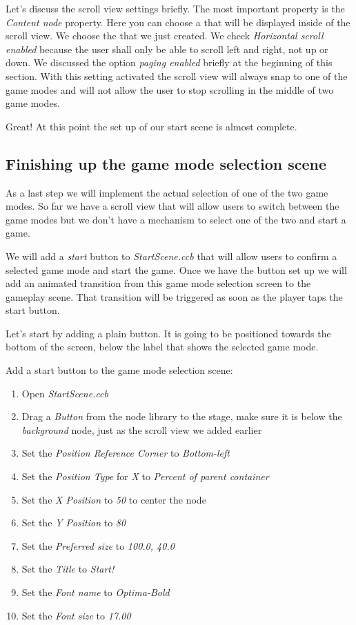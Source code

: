 Let's discuss the scroll view settings briefly. The most important property is
the \textit{Content node} property. Here you can choose a \ccbfile{} that will
be displayed inside of the scroll view. We choose the
 that we just created. We check
\textit{Horizontal scroll enabled} because the user shall only be able to scroll
left and right, not up or down. We discussed the option \textit{paging enabled}
briefly at the beginning of this section. With this setting activated the scroll
view will always snap to one of the game modes and will not allow the user to
stop scrolling in the middle of two game modes.

Great! At this point the set up of our start scene is almost complete.

\subsection{Finishing up the game mode selection scene}
As a last step we will implement the actual selection of one of the two game
modes. So far we have a scroll view that will allow users to switch between the
game modes but we don't have a mechanism to select one of the two and start a
game.

We will add a \textit{start} button to \textit{StartScene.ccb} that will
allow users to confirm a selected game mode and start the game. Once we have the button set up we will
add an animated transition from this game mode selection screen to the gameplay
scene. That transition will be triggered as soon as the player taps the start
button.

Let's start by adding a plain button. It is going to be positioned towards
the bottom of the screen, below the label that shows the selected game mode.

\begin{leftbar}
Add a start button to the game mode selection scene:
\begin{enumerate}
  \item Open \textit{StartScene.ccb} 
  \item Drag a \textit{Button} from the node library to
the stage, make sure it is below the \textit{background} node, just as the
scroll view we added earlier
  \item Set the \textit{Position Reference Corner} to \textit{Bottom-left}
  \item Set the \textit{Position Type} for \textit{X} to \textit{Percent of
  parent container}
  \item Set the \textit{X Position} to \textit{50} to center the node
  \item Set the \textit{Y Position} to \textit{80}
  \item Set the \textit{Preferred size} to \textit{100.0, 40.0}
  \item Set the \textit{Title} to \textit{Start!}
  \item Set the \textit{Font name} to \textit{Optima-Bold}
  \item Set the \textit{Font size} to \textit{17.00} 
\end{enumerate}
\end{leftbar}

